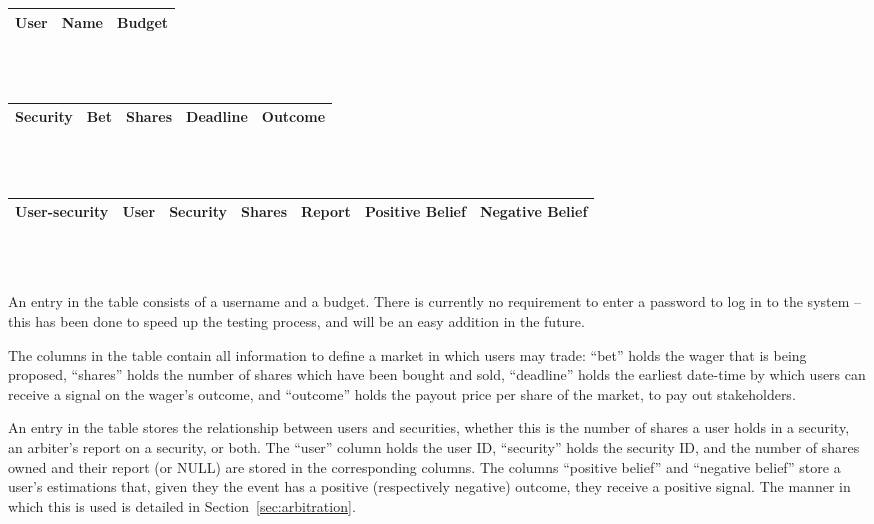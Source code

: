 \begin{table}[ht]
	\centering
	\begin{tabular}{|c|c|c|}
		\hline
		\textbf{User} & Name & Budget \\ \hline
	\end{tabular} \\~\\

	\begin{tabular}{|c|c|c|c|c|}
		\hline
		\textbf{Security} & Bet & Shares & Deadline & Outcome \\ \hline
	\end{tabular} \\~\\

	\begin{tabular}{|c|c|c|c|c|c|c|}
		\hline
		\textbf{User-security} & User & Security & Shares & Report & Positive Belief & Negative Belief \\ \hline
	\end{tabular} \\~\\
\end{table}

An entry in the  table consists of a username and a budget. There is
currently no requirement to enter a password to log in to the system -- this
has been done to speed up the testing process, and will be an easy addition in
the future.

The columns in the  table contain all information to define a
market in which users may trade: ``bet'' holds the wager that is being
proposed, ``shares'' holds the number of shares which have been bought and
sold, ``deadline'' holds the earliest date-time by which users can receive a
signal on the wager's outcome, and ``outcome'' holds the payout price per share
of the market, to pay out stakeholders.

An entry in the  table stores the relationship between
users and securities, whether this is the number of shares a user holds in a
security, an arbiter's report on a security, or both. The ``user'' column
holds the user ID, ``security'' holds the security ID, and the number of shares
owned and their report (or NULL) are stored in the corresponding columns. The
columns ``positive belief'' and ``negative belief'' store a user's estimations
that, given they the event has a positive (respectively negative) outcome, they
receive a positive signal. The manner in which this is used is detailed in
Section~\ref{sec:arbitration}.


